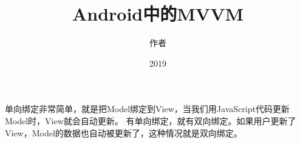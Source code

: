 \documentclass[a4paper,12pt]{ctexbook}
\title{Android中的MVVM}
\author{作者}
\date{2019}
\begin{document}
	\maketitle
	\tableofcontents
	单向绑定非常简单，就是把Model绑定到View，当我们用JavaScript代码更新Model时，View就会自动更新。
	有单向绑定，就有双向绑定。如果用户更新了View，Model的数据也自动被更新了，这种情况就是双向绑定。
\end{document}
